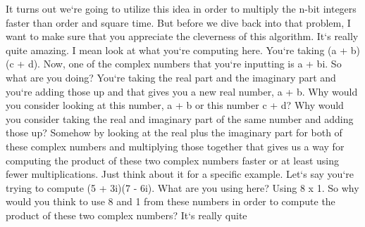 It turns out we`re going to utilize this idea in order to multiply the n-bit integers faster than order and square time.
But before we dive back into that problem, I want to make sure that you appreciate the cleverness of this algorithm.
It`s really quite amazing.
I mean look at what you`re computing here.
You`re taking (a + b)(c + d).
Now, one of the complex numbers that you`re inputting is a + bi.
So what are you doing? You`re taking the real part and the imaginary part and you`re adding those up and that gives you a new real number, a + b.
Why would you consider looking at this number, a + b or this number c + d? Why would you consider taking the real and imaginary part of the same number and adding those up? Somehow by looking at the real plus the imaginary part for both of these complex numbers and multiplying those together that gives us a way for computing the product of these two complex numbers faster or at least using fewer multiplications.
Just think about it for a specific example.
Let`s say you`re trying to compute (5 + 3i)(7 - 6i).
What are you using here? Using 8 x 1.
So why would you think to use 8 and 1 from these numbers in order to compute the product of these two complex numbers? It`s really quite

